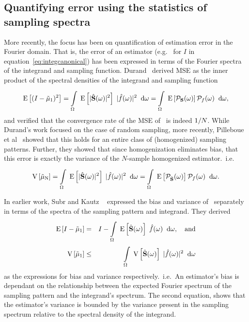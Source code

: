 \subsection{Quantifying error using the statistics of sampling spectra}
More recently, the focus has been on quantification of estimation error in the Fourier domain. That is, the error of an estimator (e.g.~ for $I$ in equation~\ref{eq:integcanonical}) has been expressed in terms of the Fourier spectra of the integrand and sampling function. 
Durand~\cite{FredoTR} derived MSE as the inner product of the spectral densities of the integrand and sampling function
\begin{equation} \label{eq:durand11}
   \mathrm{E} \left[(I-\tilde\mu_\mathrm{1})^2 \right] = \displaystyle\int\limits_{\Omega}^{} \; \mathrm{E} \left[|\hat{\mathbf{S}}(\omega)|^2 \right] \; |\hat{f}(\omega)|^2  \;\; \mathrm{d}\omega = \displaystyle\int\limits_{\Omega}^{} \; \mathrm{E} \left[\mathcal{P}_{\mathbf{S}}(\omega) \right] \mathcal{P}_{f}(\omega) \;\; \mathrm{d}\omega ,
\end{equation}
and verified that the convergence rate of the MSE of \estim{\N}\ is indeed $1/N$. While Durand's work focused on the case of random sampling, more recently, Pilleboue et al~\cite{Pilleboue:2015:VAM} showed that this holds for an entire class of (homogenized) sampling patterns. Further, they showed that since homogenization eliminates bias, that this error is exactly the variance of the $N$-sample homogenized estimator.~i.e.
\begin{equation} \label{eq:pillebouevar}
\mathrm{V} \left[\tilde\mu_\mathrm{N}\right] 
= \displaystyle\int\limits_{\Omega}^{} \; \mathrm{E} \left[|\hat{\mathbf{S}}(\omega)|^2 \right]\;|\hat{f}(\omega)|^2 \;\; \mathrm{d}\omega 
= \displaystyle\int\limits_{\Omega}^{} \; \mathrm{E} \left[\mathcal{P}_{\hat{\mathbf{S}}}(\omega) \right] \mathcal{P}_{f}(\omega) \;\; \mathrm{d}\omega. 
\end{equation}

In earlier work, Subr and Kautz ~\cite{Subr:2013:FAS} expressed the bias and variance of \ separately in terms of the spectra of the sampling pattern and integrand. They derived
\begin{eqnarray}
  \mathrm{E} \left[I-\tilde\mu_\mathrm{1} \right] &=& I - \displaystyle\int\limits_{\Omega}^{} \; \mathrm{E} \left[\hat{\mathbf{S}}(\omega) \right] \; \hat{f}(\omega)  \;\; \mathrm{d}\omega, \quad \mathrm{and} \\
    \mathrm{V} \left[\tilde\mu_\mathrm{1}\right] &\leq& \displaystyle\int\limits_{\Omega}^{} \; \mathrm{V} \left[\hat{\mathbf{S}}(\omega)\right] \; |\hat{f}(\omega)|^2 \;\; \mathrm{d}\omega
\end{eqnarray}
as the expressions for bias and variance respectively.~i.e.~An estimator's bias is dependant on the relationship between the expected Fourier spectrum of the sampling pattern and the integrand's spectrum. The second equation, shows that the estimator's variance is bounded by the variance present in the sampling spectrum relative to the spectral density of the integrand. 

